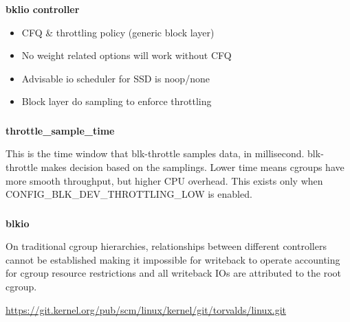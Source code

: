 \documentclass[usenames,dvipsnames, 18pt, compress, aspectratio=169]{beamer}
\begin{document}
\begin{frame}
    \frametitle{}
    \begin{center}
    \textbf{bklio controller}

        \begin{itemize}[label={\MVRightarrow}]
            \item CFQ \& throttling policy (generic block layer)
            \item No weight related options will work without CFQ
            \item Advisable io scheduler for SSD is noop/none
            \item Block layer do sampling to enforce throttling
        \end{itemize}

    \end{center}
\end{frame}

\begin{frame}
    \frametitle{}
    \begin{center}
    \textbf{throttle\_sample\_time}

		\begin{flushleft}
		This is the time window that blk-throttle samples data, in millisecond.
		blk-throttle makes decision based on the samplings. Lower time means cgroups
		have more smooth throughput, but higher CPU overhead. This exists only when
		CONFIG\_BLK\_DEV\_THROTTLING\_LOW is enabled.
		\end{flushleft}

    \end{center}
\end{frame}

\begin{frame}
    \frametitle{}
    \begin{center}
    \textbf{blkio}

		\begin{flushleft}
		On traditional cgroup hierarchies, relationships between different controllers
		cannot be established making it impossible for writeback to operate accounting
		for cgroup resource restrictions and all writeback IOs are attributed to the
		root cgroup.

        \normalsize{\href{
            https://git.kernel.org/pub/scm/linux/kernel/git/torvalds/linux.git/commit/?h=v4.14-rc4&id=3e1534cf4a2a8278e811e7c84a79da1a02347b8b
        }{https://git.kernel.org/pub/scm/linux/kernel/git/torvalds/linux.git}}
		\end{flushleft}

    \end{center}
\end{frame}
\end{document}
